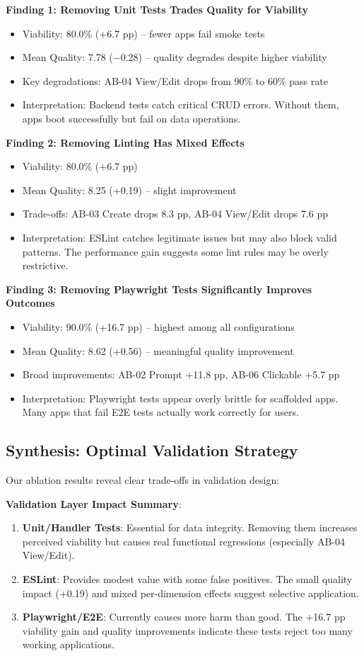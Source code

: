 \documentclass[11pt]{article}
\begin{document}
\textbf{Finding 1: Removing Unit Tests Trades Quality for Viability}
\begin{itemize}
\item Viability: 80.0\% (+6.7 pp) -- fewer apps fail smoke tests
\item Mean Quality: 7.78 ($-0.28$) -- quality degrades despite higher viability
\item Key degradations: AB-04 View/Edit drops from 90\% to 60\% pass rate
\item Interpretation: Backend tests catch critical CRUD errors. Without them, apps boot successfully but fail on data operations.
\end{itemize}

\textbf{Finding 2: Removing Linting Has Mixed Effects}
\begin{itemize}
\item Viability: 80.0\% (+6.7 pp)
\item Mean Quality: 8.25 (+0.19) -- slight improvement
\item Trade-offs: AB-03 Create drops 8.3 pp, AB-04 View/Edit drops 7.6 pp
\item Interpretation: ESLint catches legitimate issues but may also block valid patterns. The performance gain suggests some lint rules may be overly restrictive.
\end{itemize}

\textbf{Finding 3: Removing Playwright Tests Significantly Improves Outcomes}
\begin{itemize}
\item Viability: 90.0\% (+16.7 pp) -- highest among all configurations
\item Mean Quality: 8.62 (+0.56) -- meaningful quality improvement
\item Broad improvements: AB-02 Prompt +11.8 pp, AB-06 Clickable +5.7 pp
\item Interpretation: Playwright tests appear overly brittle for scaffolded apps. Many apps that fail E2E tests actually work correctly for users.
\end{itemize}

\subsection{Synthesis: Optimal Validation Strategy}

Our ablation results reveal clear trade-offs in validation design:

\textbf{Validation Layer Impact Summary}:
\begin{enumerate}
\item \textbf{Unit/Handler Tests}: Essential for data integrity. Removing them increases perceived viability but causes real functional regressions (especially AB-04 View/Edit).
\item \textbf{ESLint}: Provides modest value with some false positives. The small quality impact (+0.19) and mixed per-dimension effects suggest selective application.
\item \textbf{Playwright/E2E}: Currently causes more harm than good. The +16.7 pp viability gain and quality improvements indicate these tests reject too many working applications.
\end{enumerate}
\end{document}
